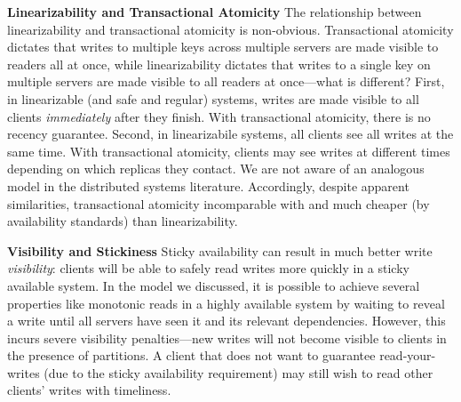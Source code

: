 \vspace{.5em}\noindent\textbf{Linearizability and Transactional
  Atomicity} The relationship between linearizability and
transactional atomicity is non-obvious. Transactional atomicity
dictates that writes to multiple keys across multiple servers are made
visible to readers all at once, while linearizability dictates that
writes to a single key on multiple servers are made visible to all
readers at once---what is different? First, in linearizable (and safe
and regular) systems, writes are made visible to all clients
\textit{immediately} after they finish. With transactional atomicity,
there is no recency guarantee. Second, in linearizabile systems, all
clients see all writes at the same time. With transactional atomicity,
clients may see writes at different times depending on which replicas
they contact. We are not aware of an analogous model in the
distributed systems literature. Accordingly, despite apparent
similarities, transactional atomicity incomparable with and much
cheaper (by availability standards) than linearizability.

\vspace{.5em}\noindent\textbf{Visibility and Stickiness} Sticky
availability can result in much better write \textit{visibility}:
clients will be able to safely read writes more quickly in a sticky
available system. In the model we discussed, it is possible to achieve
several properties like monotonic reads in a highly available system
by waiting to reveal a write until all servers have seen it and its
relevant dependencies. However, this incurs severe visibility
penalties---new writes will not become visible to clients in the
presence of partitions. A client that does not want to guarantee
read-your-writes (due to the sticky availability requirement) may
still wish to read other clients' writes with timeliness.

